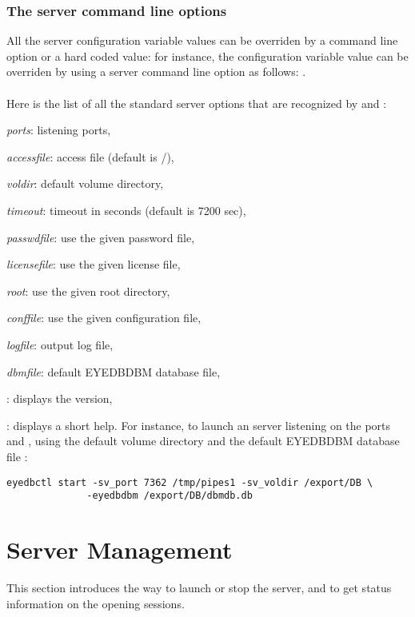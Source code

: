 \subsubsection{The server command line options}
All the server configuration variable values can be overriden by a command line
option or a hard coded value: for instance, the  configuration
variable value can be overriden by using a server command line option
as follows:
.
\\
\\
Here is the list of all the standard server options that are recognized
by  and :
\bi
\item {} \emph{ports}:  listening ports,
\item {} \emph{accessfile}: access file (default is \tdir/),
\item {} \emph{voldir}: default volume directory,
\item {} \emph{timeout}: timeout in seconds (default is 7200 sec),
\item {} \emph{passwdfile}: use the given password file,
\item {} \emph{licensefile}: use the given license file,
\item {} \emph{root}: use the given \eyedb root directory,
\item {} \emph{conffile}: use the given configuration file,
\item {} \emph{logfile}: output log file,
\item {} \emph{dbmfile}: default EYEDBDBM database file,
\item {}: displays the \eyedb version,
\item {}: displays a short help.
\ei
For instance, to launch an \eyedb server listening on the ports  and
, using the default volume directory 
and the default EYEDBDBM database file :
\begin{verbatim}
eyedbctl start -sv_port 7362 /tmp/pipes1 -sv_voldir /export/DB \
              -eyedbdbm /export/DB/dbmdb.db
\end{verbatim}

\section{Server Management}
This section introduces the way to launch or stop the server, and to
get status information on the opening sessions.
